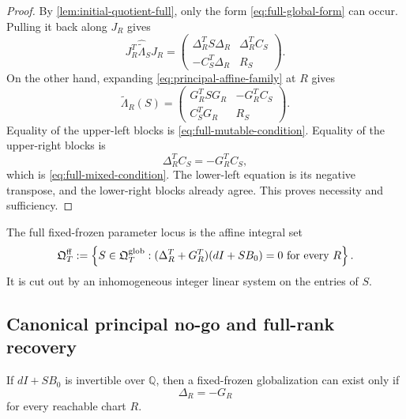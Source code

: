 \begin{proof}
By \cref{lem:initial-quotient-full}, only the form
\cref{eq:full-global-form} can occur.  Pulling it back along $J_R$ gives
\begin{equation}
 J_R^T\widehat{\widetilde\Lambda}_SJ_R
 =\begin{pmatrix}
   \Delta_R^TS\Delta_R&\Delta_R^TC_S\\
   -C_S^T\Delta_R&R_S
  \end{pmatrix}.
 \label{eq:actual-full-pullback}
\end{equation}
On the other hand, expanding \cref{eq:principal-affine-family} at $R$ gives
\begin{equation}
 \widetilde\Lambda_R(S)
 =\begin{pmatrix}
   G_R^TSG_R&-G_R^TC_S\\
   C_S^TG_R&R_S
  \end{pmatrix}.
 \label{eq:desired-full-form}
\end{equation}
Equality of the upper-left blocks is
\cref{eq:full-mutable-condition}.  Equality of the upper-right blocks is
\[
 \Delta_R^TC_S=-G_R^TC_S,
\]
which is \cref{eq:full-mixed-condition}.  The lower-left equation is its
negative transpose, and the lower-right blocks already agree.  This proves
necessity and sufficiency.
\end{proof}

\begin{definition}
The full fixed-frozen parameter locus is the affine integral set
\begin{equation}
 \mathfrak Q_T^{\mathrm{ff}}
 :=\left\{
 S\in\mathfrak Q^{\mathrm{glob}}_T:
 (\Delta_R^T+G_R^T)(dI+SB_0)=0
 \text{ for every }R
 \right\}.
 \label{eq:Q-ff}
\end{equation}
It is cut out by an inhomogeneous integer linear system on the entries of
$S$.
\end{definition}

\subsection{Canonical principal no-go and full-rank recovery}

\begin{corollary}
\label{cor:invertible-mixed-block}
If $dI+SB_0$ is invertible over $\mathbb Q$, then a fixed-frozen
globalization can exist only if
\begin{equation}
 \Delta_R=-G_R
 \label{eq:Delta-minus-G}
\end{equation}
for every reachable chart $R$.
\end{corollary}

